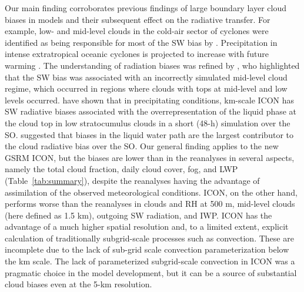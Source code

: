 \documentclass[draft]{agujournal2019}
\begin{document}
Our main finding corroborates previous findings of large boundary layer cloud biases in models and their subsequent effect on the radiative transfer. For example, low- and mid-level clouds in the cold-air sector of cyclones were identified as being responsible for most of the SW bias by . Precipitation in intense extratropical oceanic cyclones is projected to increase with future warming \cite{kodama2019}. The understanding of radiation biases was refined by , who highlighted that the SW bias was associated with an incorrectly simulated mid-level cloud regime, which occurred in regions where clouds with tops at mid-level and low levels occurred.  have shown that in precipitating conditions, km-scale ICON has SW radiative biases associated with the overrepresentation of the liquid phase at the cloud top in low stratocumulus clouds in a short (48-h) simulation over the SO.  suggested that biases in the liquid water path are the largest contributor to the cloud radiative bias over the SO. Our general finding applies to the new GSRM ICON, but the biases are lower than in the reanalyses in several aspects, namely the total cloud fraction, daily cloud cover, fog, and LWP (Table~\ref{tab:summary}), despite the reanalyses having the advantage of assimilation of the observed meteorological conditions. ICON, on the other hand, performs worse than the reanalyses in clouds and RH at 500 m, mid-level clouds (here defined as 1.5 km), outgoing SW radiation, and IWP. ICON has the advantage of a much higher spatial resolution and, to a limited extent, explicit calculation of traditionally subgrid-scale processes such as convection. These are incomplete due to the lack of sub-grid scale convection parameterization below the km scale. The lack of parameterized subgrid-scale convection in ICON was a pragmatic choice in the model development, but it can be a source of substantial cloud biases even at the 5-km resolution.
\end{document}
